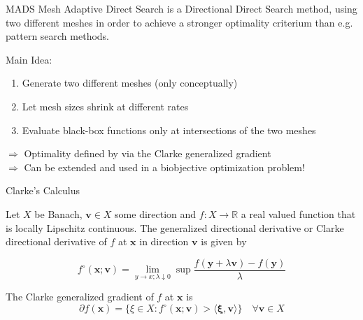 \documentclass[aspectratio=43,t]{beamer}
\renewcommand{\vec}[1]{\mathbf{#1}}
\begin{document}
	\begin{frame}[fragile]{MADS}
		Mesh Adaptive Direct Search is a Directional Direct Search method, using two different
		meshes in order to achieve a stronger optimality criterium than e.g. pattern search methods.\\
		\bigskip
		
		\begin{block}{Main Idea:}
      	\begin{enumerate}
			\item<2-> Generate two different meshes (only conceptually)
        	\item<3-> Let mesh sizes shrink at different rates
        	\item<4-> Evaluate black-box functions only at intersections of the two meshes
      	\end{enumerate}
		\bigskip
		$\Rightarrow$ Optimality defined by via the Clarke generalized gradient\\
		\bigskip
		$\Rightarrow$ Can be extended and used in a biobjective optimization problem!\\
    \end{block}
	\end{frame}

	\begin{frame}[fragile]{Clarke's Calculus}
		\begin{definition}
        \label{def:generalized_deriv}
        Let $X$ be Banach, $\vec{v} \in X$ some direction and 
        $f : X \rightarrow \mathbb{R}$ a real valued
        function that is locally Lipschitz continuous.
        The generalized directional derivative or Clarke directional
        derivative of $f$ at $\vec{x}$ in direction $\vec{v}$ is given by

        \begin{equation}
            f^{\circ}(\vec{x};\vec{v}) = 
            \lim_{y \rightarrow x; \lambda \downarrow 0} \sup
             \frac{f(\vec{y} + \lambda \vec{v}) - f(\vec{y})}{\lambda}
        \end{equation}
    	\end{definition}

		\begin{definition}
        The Clarke generalized gradient of $f$ at $\vec{x}$ is
        \begin{equation}
            \partial f(\vec{x}) = 
            \{\xi \in X : f^{\circ}(\vec{x}; \vec{v}) >
             \langle \vec{\xi}, \vec{v} \rangle\}
             \quad \forall \vec{v} \in X
        \end{equation}
	    \end{definition}


		\end{frame}
\end{document}
